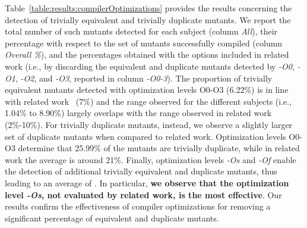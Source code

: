 Table~\ref{table:results:compilerOptimizations} provides the results concerning the detection of trivially equivalent and trivially duplicate mutants. We report the total number of such mutants detected for each subject (column \emph{All}), their percentage with respect to the set of mutants successfully compiled (column \emph{Overall \%}), and the percentages obtained with the options included in related work (i.e., by discarding the equivalent and duplicate mutants detected by \emph{-O0}, \emph{-O1}, \emph{-O2}, and \emph{-O3}, reported in column \emph{-O0-3}).
 The proportion of trivially equivalent mutants detected with optimization levels O0-O3 (6.22\%) is in line with related work~\cite{papadakis2015trivial} (7\%) and the range observed for the different subjects (i.e., 1.04\% to 8.90\%) largely overlaps with the range observed in related work (2\%-10\%).
 For trivially duplicate mutants, instead, we observe a slightly larger set of duplicate mutants when compared to related work. Optimization levels O0-O3 determine that 25.99\% of the mutants are trivially duplicate, while in related work the average is around 21\%. Finally,
 optimization levels \emph{-Os} and \emph{-Of} enable the detection of additional trivially equivalent and duplicate mutants, thus leading to an average of . In particular, \textbf{we observe that the optimization level \emph{-Os}, not evaluated by related work, is the most effective}. Our results confirm the effectiveness of compiler optimizations for removing a significant percentage of equivalent and duplicate mutants.

